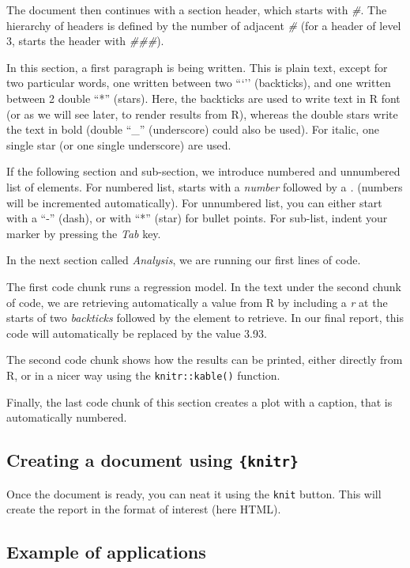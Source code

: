 \documentclass[
]{krantz}
\begin{document}
The document then continues with a section header, which starts with \emph{\#}. The hierarchy of headers is defined by the number of adjacent \emph{\#} (for a header of level 3, starts the header with \emph{\#\#\#}).

In this section, a first paragraph is being written. This is plain text, except for two particular words, one written between two ```'' (backticks), and one written between 2 double ``*'' (stars). Here, the backticks are used to write text in R font (or as we will see later, to render results from R), whereas the double stars write the text in bold (double ``\_'' (underscore) could also be used). For italic, one single star (or one single underscore) are used.

If the following section and sub-section, we introduce numbered and unnumbered list of elements. For numbered list, starts with a \emph{number} followed by a \emph{.} (numbers will be incremented automatically). For unnumbered list, you can either start with a ``-'' (dash), or with ``*'' (star) for bullet points. For sub-list, indent your marker by pressing the \emph{Tab} key.

In the next section called \emph{Analysis}, we are running our first lines of code.

The first code chunk runs a regression model. In the text under the second chunk of code, we are retrieving automatically a value from R by including a \emph{r} at the starts of two \emph{backticks} followed by the element to retrieve. In our final report, this code will automatically be replaced by the value 3.93.

The second code chunk shows how the results can be printed, either directly from R, or in a nicer way using the \texttt{knitr::kable()} function.

Finally, the last code chunk of this section creates a plot with a caption, that is automatically numbered.

\hypertarget{creating-a-document-using-knitr}{%
\subsection{\texorpdfstring{Creating a document using \texttt{\{knitr\}}}{Creating a document using \{knitr\}}}\label{creating-a-document-using-knitr}}

Once the document is ready, you can neat it using the \texttt{knit} button. This will create the report in the format of interest (here HTML).

\hypertarget{example-of-applications}{%
\subsection{Example of applications}\label{example-of-applications}}
\end{document}
